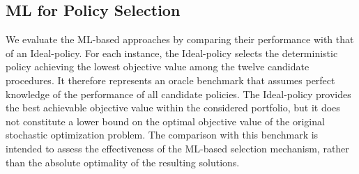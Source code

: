 \documentclass[authoryear,preprint,12pt]{elsarticle}
\begin{document}
\subsection{ML for Policy Selection} \label{mlpolicies}



We evaluate the ML-based approaches by comparing their performance with that of an Ideal-policy. For each instance, the Ideal-policy selects the deterministic policy achieving the lowest objective value among the twelve candidate procedures. It therefore represents an oracle benchmark that assumes perfect knowledge of the performance of all candidate policies. The Ideal-policy provides the best achievable objective value within the considered portfolio, but it does not constitute a lower bound on the optimal objective value of the original stochastic optimization problem. The comparison with this benchmark is intended to assess the effectiveness of the ML-based selection mechanism, rather than the absolute optimality of the resulting solutions.
\end{document}

